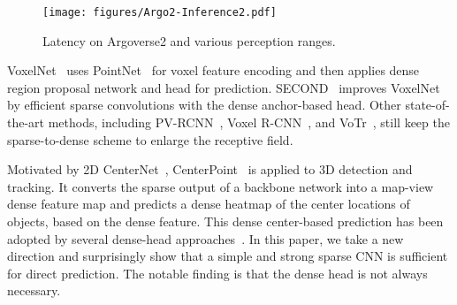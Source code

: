 \documentclass[10pt,twocolumn,letterpaper]{article}
\begin{document}
\begin{table}[t]
\begin{center}
\caption{Comparison with CenterPoint on nuScenes dataset. VoxelNeXt presents better performance with high efficiency.}
\label{tab:computation-comparison}
\end{center}
\end{table}
\begin{figure}[t]
\begin{center}
   \texttt{[image: figures/Argo2-Inference2.pdf]}
   \caption{Latency on Argoverse2 and various perception ranges.}
   \label{fig:argo2-efficiency-comparison}
\end{center}
\end{figure}
VoxelNet~\cite{voxelnet} uses PointNet~\cite{pointnet++} for voxel feature encoding and then applies dense region proposal network and head for prediction. SECOND~\cite{second} improves VoxelNet by efficient sparse convolutions with the dense anchor-based head. Other state-of-the-art methods, including PV-RCNN~\cite{pvrcnn}, Voxel R-CNN~\cite{voxel-rcnn}, and VoTr~\cite{voxeltransformer}, still keep the sparse-to-dense scheme to enlarge the receptive field. 

Motivated by 2D CenterNet~\cite{centernet}, CenterPoint~\cite{centerpoint} is applied to 3D detection and tracking. It converts the sparse output of a backbone network into a map-view dense feature map and predicts a dense heatmap of the center locations of objects, based on the dense feature. This dense center-based prediction has been adopted by several dense-head approaches~\cite{bevfusion-mit,bevfusion-ali}. In this paper, we take a new direction and surprisingly show that a simple and strong sparse CNN is sufficient for direct prediction. The notable finding is that the dense head is not always necessary.
\end{document}
